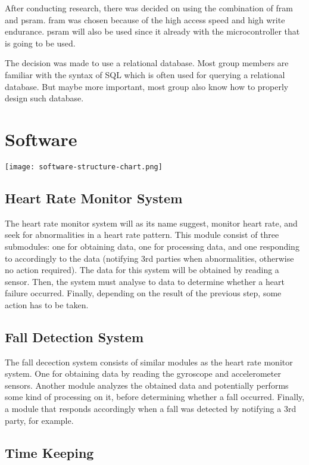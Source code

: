 \documentclass{article}
\begin{document}
After conducting research, there was decided on using the combination of \gls{fram} and \gls{psram}.
\gls{fram} was chosen because of the high access speed and high write endurance.
\gls{psram} will also be used since it already with the microcontroller that is going to be used.

The decision was made to use a relational database.
Most group members are familiar with the syntax of SQL which is often used for querying a relational database.
But maybe more important, most group also know how to properly design such database.

\clearpage

\section{Software}

\texttt{[image: software-structure-chart.png]}

\subsection{Heart Rate Monitor System}

The heart rate monitor system will as its name suggest, monitor heart rate, and seek for abnormalities in a heart rate pattern.
This module consist of three submodules: one for obtaining data, one for processing data, and one responding to accordingly to the data (notifying 3rd parties when abnormalities, otherwise no action required).
The data for this system will be obtained by reading a sensor.
Then, the system must analyse to data to determine whether a heart failure occurred.
Finally, depending on the result of the previous step, some action has to be taken.

\subsection{Fall Detection System}

The fall decection system consists of similar modules as the heart rate monitor system.
One for obtaining data by reading the gyroscope and accelerometer sensors.
Another module analyzes the obtained data and potentially performs some kind of processing on it, before determining whether a fall occurred.
Finally, a module that responds accordingly when a fall was detected by notifying a 3rd party, for example.

\subsection{Time Keeping}
\end{document}
